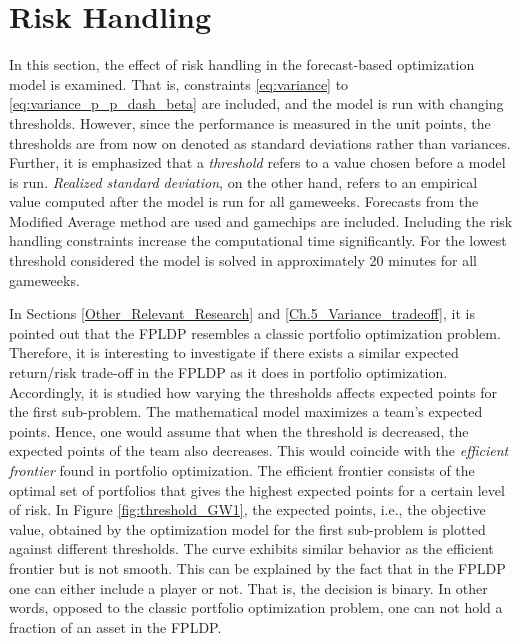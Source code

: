 \section{Risk Handling} \label{sec:res_risk_hand}


In this section, the effect of risk handling in the forecast-based optimization model is examined. That is, constraints \ref{eq:variance} to \ref{eq:variance_p_p_dash_beta} are included, and the model is run with changing thresholds. However, since the performance is measured in the unit points, the thresholds are from now on denoted as standard deviations rather than variances. Further, it is emphasized that a \textit{threshold} refers to a value chosen before a model is run. \textit{Realized standard deviation}, on the other hand, refers to an empirical value computed after the model is run for all gameweeks. Forecasts from the Modified Average method are used and gamechips are included. Including the risk handling constraints increase the computational time significantly. For the lowest threshold considered the model is solved in approximately 20 minutes for all gameweeks.

\newpar

In Sections \ref{Other_Relevant_Research} and  \ref{Ch.5_Variance_tradeoff}, it is pointed out that the FPLDP resembles a classic portfolio optimization problem. Therefore, it is interesting to investigate if there exists a similar expected return/risk trade-off in the FPLDP as it does in portfolio optimization. Accordingly, it is studied how varying the thresholds affects expected points for the first sub-problem. The mathematical model maximizes a team's expected points. Hence, one would assume that when the threshold is decreased, the expected points of the team also decreases. This would coincide with the \textit{efficient frontier} found in portfolio optimization. The efficient frontier consists of the optimal set of portfolios that gives the highest expected points for a certain level of risk. In Figure \ref{fig:threshold_GW1}, the expected points, i.e., the objective value, obtained by the optimization model for the first sub-problem is plotted against different thresholds. The curve exhibits similar behavior as the efficient frontier but is not smooth. This can be explained by the fact that in the FPLDP one can either include a player or not. That is, the decision is binary. In other words, opposed to the classic portfolio optimization problem, one can not hold a fraction of an asset in the FPLDP.

\newpar

